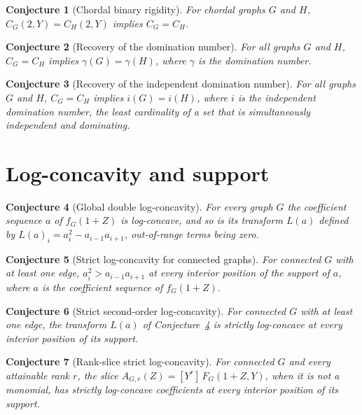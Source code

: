 \documentclass[11pt]{article}
\newtheorem{conjecture}{Conjecture}
\theoremstyle{definition}
\begin{document}
\begin{conjecture}[Chordal binary rigidity]\label{u8}
For chordal graphs $G$ and $H$, $C_G(2,Y)=C_H(2,Y)$ implies $C_G=C_H$.
\end{conjecture}

\begin{conjecture}[Recovery of the domination number]\label{u9}
For all graphs $G$ and $H$, $C_G=C_H$ implies $\gamma(G)=\gamma(H)$, where $\gamma$ is the domination number.
\end{conjecture}

\begin{conjecture}[Recovery of the independent domination number]\label{u10}
For all graphs $G$ and $H$, $C_G=C_H$ implies $i(G)=i(H)$, where $i$ is the independent domination number, the least cardinality of a set that is simultaneously independent and dominating.
\end{conjecture}

\section{Log-concavity and support}

\begin{conjecture}[Global double log-concavity]\label{u11}
For every graph $G$ the coefficient sequence $a$ of $f_G(1+Z)$ is log-concave, and so is its transform $L(a)$ defined by $L(a)_i=a_i^2-a_{i-1}a_{i+1}$, out-of-range terms being zero.
\end{conjecture}

\begin{conjecture}[Strict log-concavity for connected graphs]\label{u12}
For connected $G$ with at least one edge, $a_i^2>a_{i-1}a_{i+1}$ at every interior position of the support of $a$, where $a$ is the coefficient sequence of $f_G(1+Z)$.
\end{conjecture}

\begin{conjecture}[Strict second-order log-concavity]\label{u13}
For connected $G$ with at least one edge, the transform $L(a)$ of Conjecture~\ref{u11} is strictly log-concave at every interior position of its support.
\end{conjecture}

\begin{conjecture}[Rank-slice strict log-concavity]\label{u14}
For connected $G$ and every attainable rank $r$, the slice $A_{G,r}(Z)=[Y^r]\,F_G(1+Z,Y)$, when it is not a monomial, has strictly log-concave coefficients at every interior position of its support.
\end{conjecture}
\end{document}

